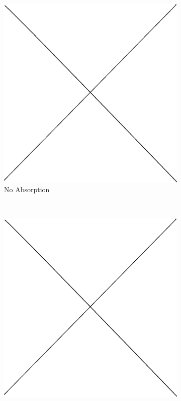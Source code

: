 \begin{figure}
        \centering
        \begin{subfigure}[b]{0.45\textwidth}
                \includegraphics[width=\textwidth]{graphics/placeholder.eps}
                \caption{No Absorption}
                \label{fig:singlestarthin}
        \end{subfigure}
        ~ 
        \begin{subfigure}[b]{0.45\textwidth}
                \includegraphics[width=\textwidth]{graphics/placeholder.eps}

\end{subfigure}
\end{figure}
